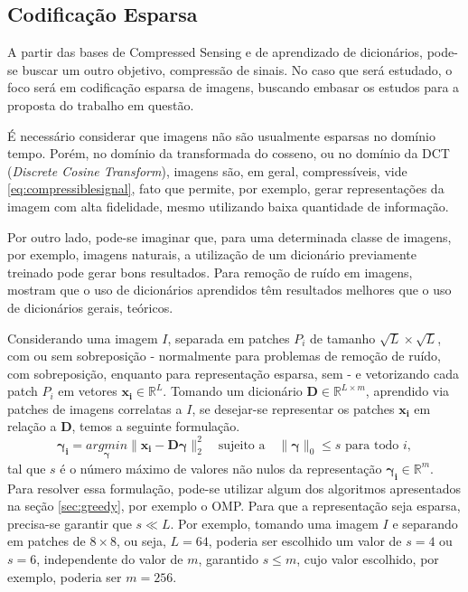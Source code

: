 \documentclass[cic,tc]{iiufrgs}
\renewcommand{\vec}[1]{\bm{#1}}
\newcommand{\mat}[1]{\bm{#1}}
\begin{document}
\subsection{Codificação Esparsa}
\label{sec:codesparsa}
A partir das bases de Compressed Sensing e de aprendizado de dicionários, pode-se 
buscar um outro objetivo, compressão de sinais.
No caso que será estudado, o foco será em codificação esparsa de imagens, buscando 
embasar os estudos para a proposta do trabalho em questão.

É necessário considerar que imagens não são usualmente esparsas no domínio tempo.
Porém, no domínio da transformada do cosseno, ou no domínio da DCT (\textit{Discrete Cosine Transform}), 
imagens são, em geral, compressíveis, vide \eqref{eq:compressiblesignal}, fato 
que permite, por exemplo, gerar representações da imagem com alta fidelidade, mesmo
utilizando baixa quantidade de informação.

Por outro lado, pode-se imaginar que, para uma determinada classe de imagens,
por exemplo, imagens naturais, a utilização de um dicionário previamente treinado 
pode gerar bons resultados. Para remoção de ruído em imagens, \citet{EladDenoising} 
mostram que o uso de dicionários aprendidos têm resultados melhores que o uso de 
dicionários gerais, teóricos.

Considerando uma imagem $I$, separada em patches $P_i$ de tamanho $\sqrt{L}\times\sqrt{L}$, 
com ou sem sobreposição - normalmente para problemas de remoção de ruído, com sobreposição,
enquanto para representação esparsa, sem - e vetorizando cada patch $P_i$ em vetores
$\vec{x_i} \in \mathbb{R}^L$. Tomando um dicionário $\mat{D} \in \mathbb{R}^{L\times m}$, 
aprendido via patches de imagens correlatas a $I$, se desejar-se representar os patches 
$\vec{x_i}$ em relação a $\mat{D}$, temos a seguinte formulação.
\begin{equation}
    \label{eq:patchcoding}
    \vec{\gamma_i} = \underset{\vec{\gamma}}{argmin} \lVert \vec{x_i} - \mat{D}\vec{\gamma} \rVert_2^2
    \hspace{1em} \text{sujeito a} \hspace{1em}
    \lVert \vec{\gamma} \rVert_0 \le s
    \text{ para todo } i,
\end{equation}
tal que $s$ é o número máximo de valores não nulos da representação $\vec{\gamma_i} \in \mathbb{R}^m$.
Para resolver essa formulação, pode-se utilizar algum dos algoritmos apresentados na
seção \autoref{sec:greedy}, por exemplo o OMP. 
Para que a representação seja esparsa, precisa-se garantir que $s \ll L$.
Por exemplo, tomando uma imagem $I$ e separando em patches de $8\times 8$, ou seja,
$L = 64$, poderia ser escolhido um valor de $s = 4$ ou $s=6$, independente do valor 
de $m$, garantido $s \le m$, cujo valor escolhido, por exemplo, poderia ser $m = 256$.
\end{document}
